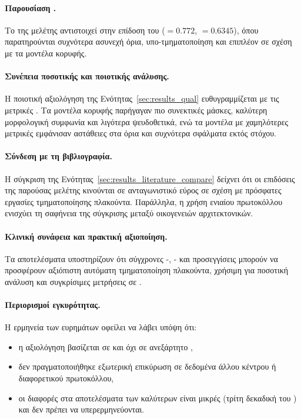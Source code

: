 \paragraph{Παρουσίαση .}
Το  της μελέτης αντιστοιχεί στην επίδοση του 
($=0.772$, $=0.6345$), όπου παρατηρούνται συχνότερα ασυνεχή όρια,
υπο-τμηματοποίηση και επιπλέον  σε σχέση με τα μοντέλα κορυφής.

\paragraph{Συνέπεια ποσοτικής και ποιοτικής ανάλυσης.}
Η ποιοτική αξιολόγηση της Ενότητας~\ref{sec:results_qual} ευθυγραμμίζεται με
τις μετρικές . Τα μοντέλα κορυφής παρήγαγαν πιο συνεκτικές μάσκες,
καλύτερη μορφολογική συμφωνία και λιγότερα ψευδοθετικά, ενώ τα μοντέλα με
χαμηλότερες μετρικές εμφάνισαν αστάθειες στα όρια και συχνότερα σφάλματα εκτός στόχου.

\paragraph{Σύνδεση με τη βιβλιογραφία.}
Η σύγκριση της Ενότητας~\ref{sec:results_literature_compare} δείχνει ότι οι
επιδόσεις της παρούσας μελέτης κινούνται σε ανταγωνιστικό εύρος σε σχέση με
πρόσφατες εργασίες τμηματοποίησης πλακούντα. Παράλληλα, η χρήση ενιαίου
πρωτοκόλλου ενισχύει τη σαφήνεια της σύγκρισης μεταξύ οικογενειών αρχιτεκτονικών.

\paragraph{Κλινική συνάφεια και πρακτική αξιοποίηση.}
Τα αποτελέσματα υποστηρίζουν ότι σύγχρονες -, - και 
προσεγγίσεις μπορούν να προσφέρουν αξιόπιστη αυτόματη τμηματοποίηση πλακούντα,
χρήσιμη για ποσοτική ανάλυση και συγκρίσιμες μετρήσεις σε . 

\paragraph{Περιορισμοί εγκυρότητας.}
Η ερμηνεία των ευρημάτων οφείλει να λάβει υπόψη ότι:
\begin{itemize}
  \item η αξιολόγηση βασίζεται σε  και όχι σε ανεξάρτητο
  ,
  \item δεν πραγματοποιήθηκε εξωτερική επικύρωση σε δεδομένα άλλου κέντρου ή
  διαφορετικού πρωτοκόλλου,
  \item οι διαφορές στα αποτελέσματα των καλύτερων είναι μικρές (τρίτη δεκαδική του
  ) και δεν πρέπει να υπερερμηνεύονται.
\end{itemize}

